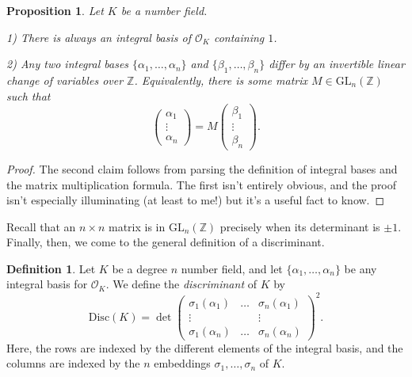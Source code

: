 \documentclass[12pt]{amsart}
\newtheorem{proposition}[theorem]{Proposition}
\theoremstyle{definition} \newtheorem*{notation}{Notation}
\theoremstyle{remark} \newtheorem*{remark}{Remark}
\theoremstyle{remark} \newtheorem*{example}{Example}
\theoremstyle{definition} \newtheorem*{definition}{Definition}
\numberwithin{equation}{section}
\numberwithin{theorem}{section}
\begin{document}
	\begin{proposition} \label{prop:integral-basis}
		Let $K$ be a number field.
		
		1) There is always an integral basis of $\mathcal{O}_K$ containing $1$.
		
		2)  Any two integral bases $\{\alpha_1,\dots,\alpha_n\}$ and $\{\beta_1,\dots,\beta_n\}$ differ by an invertible linear change of variables over $\mathbb{Z}$.  Equivalently, there is some matrix $M \in \mathrm{GL}_n(\mathbb{Z})$ such that 
			\[
				\begin{pmatrix} \alpha_1 \\ \vdots \\ \alpha_n \end{pmatrix} = M \begin{pmatrix} \beta_1 \\ \vdots \\ \beta_n\end{pmatrix}.
			\]
	\end{proposition}
	\begin{proof}
		The second claim follows from parsing the definition of integral bases and the matrix multiplication formula.  The first isn't entirely obvious, and the proof isn't especially illuminating (at least to me!) but it's a useful fact to know.
	\end{proof}
	
	Recall that an $n\times n$ matrix is in $\mathrm{GL}_n(\mathbb{Z})$ precisely when its determinant is $\pm 1$.  Finally, then, we come to the general definition of a discriminant.
	
	\begin{definition}
		Let $K$ be a degree $n$ number field, and let $\{\alpha_1,\dots,\alpha_n\}$ be any integral basis for $\mathcal{O}_K$.  We define the \emph{discriminant} of $K$ by
			\[
				\mathrm{Disc}(K) = \det\begin{pmatrix}
					\sigma_1(\alpha_1) & \dots & \sigma_n(\alpha_1) \\
					\vdots & & \vdots \\
					\sigma_1(\alpha_n) & \dots & \sigma_n(\alpha_n)
				\end{pmatrix}^2.
			\]
		Here, the rows are indexed by the different elements of the integral basis, and the columns are indexed by the $n$ embeddings $\sigma_1,\dots,\sigma_n$ of $K$.
	\end{definition}
\end{document}
